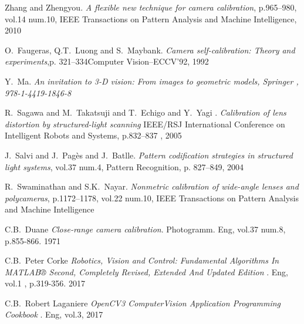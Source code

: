 \documentclass[journal,final,a4paper,twoside]{PS}
\begin{document}
%

\begin{thebibliography}{1}
Zhang and Zhengyou. \emph{A flexible new technique for camera calibration}, p.965--980, vol.14 num.10, IEEE Transactions on Pattern Analysis and Machine Intelligence, 2010


O.~Faugeras, Q.T.~Luong and S.~Maybank. \emph{Camera self-calibration: Theory and experiments},p. 321--334Computer Vision--ECCV'92, 1992

Y.~Ma. \emph{{An invitation to 3-D vision: From images to geometric models}, {Springer} , {978-1-4419-1846-8}}

R.~Sagawa and M.~Takatsuji and T.~Echigo and Y.~Yagi . \emph{Calibration of lens distortion by structured-light scanning} IEEE/RSJ International Conference on Intelligent Robots and Systems, p.832--837 , 2005

J.~Salvi and J.~Pag{\`e}s and J.~Batlle. \emph{Pattern codification strategies in structured light systems}, vol.37 num.4, Pattern Recognition, p. 827--849, 2004

R.~Swaminathan and S.K.~Nayar. \emph{Nonmetric calibration of wide-angle lenses and polycameras}, p.1172--1178, vol.22 num.10, IEEE Transactions on Pattern Analysis and Machine Intelligence


C.B.~Duane  \emph{Close-range camera calibration}. Photogramm. Eng, vol.37 num.8, p.855-866. 1971

C.B.~Peter Corke  \emph{Robotics, Vision and Control: Fundamental Algorithms In MATLAB® Second, Completely Revised, Extended And Updated Edition }. Eng, vol.1 , p.319-356. 2017

C.B.~Robert Laganiere  \emph{OpenCV3 ComputerVision Application Programming Cookbook }. Eng, vol.3, 2017


\end{thebibliography}
\end{document}
